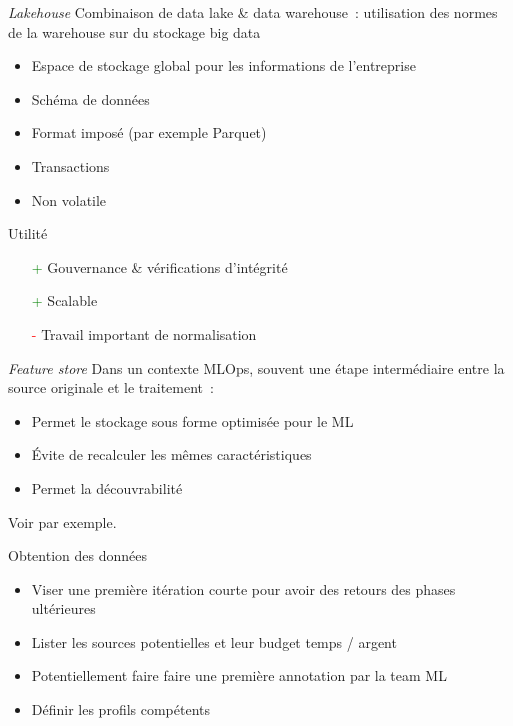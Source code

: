 \begin{frame}{\textit{Lakehouse}}
  Combinaison de data lake \& data warehouse~: utilisation des normes de la warehouse sur du stockage big data
  \begin{itemize}
    \item Espace de stockage global pour les informations de l'entreprise
    \item Schéma de données
    \item Format imposé (par exemple Parquet)
    \item Transactions
    \item Non volatile
  \end{itemize}

  Utilité

  \begin{itemize}
    \item[\textcolor{green}{+}] Gouvernance \& vérifications d'intégrité
    \item[\textcolor{green}{+}] Scalable
    \item[\textcolor{red}{-}] Travail important de normalisation
  \end{itemize}
\end{frame}

\begin{frame}{\textit{Feature store}}
  Dans un contexte MLOps, souvent une étape intermédiaire entre la source originale et le traitement~:

  \begin{itemize}
    \item Permet le stockage sous forme optimisée pour le ML
    \item Évite de recalculer les mêmes caractéristiques
    \item Permet la découvrabilité
  \end{itemize}

  Voir  par exemple.
\end{frame}

\begin{frame}{Obtention des données}
  \begin{itemize}
    \item Viser une première itération courte pour avoir des retours des phases ultérieures
    \item Lister les sources potentielles et leur budget temps / argent
    \item Potentiellement faire faire une première annotation par la team ML
    \item Définir les profils compétents
  \end{itemize}
\end{frame}

